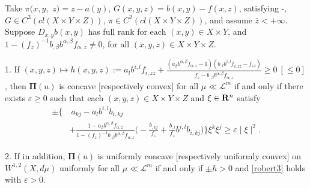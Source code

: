 \begin{example}\label{general example3}
	Take $\pi(x, y,$ $ z) =z-a(y)$,  $G(x,y,z)= b(x,y)-f(x,z)$,  satisfying \Gzero-\Gsix,  $G \in C^3(cl(X\times Y \times Z)
	)$, $\pi \in C^2(cl(X\times Y \times Z)
	)$, and assume $\bar{z}<+\infty$. Suppose $D_{x,y}b(x,y)$ has full rank for each $(x,y) \in X\times Y$, and $1- (f_{z})^{-1}b_{,\beta}b^{\alpha,\beta}f_{\alpha,z} \ne 0$, for all $(x, y,z) \in X\times Y\times Z$.
	
	1. If $(x,y,z)\longmapsto h(x,y,z):=a_{l}b^{i,l}f_{i,zz}+\frac{(a_{\beta}b^{\alpha,\beta}f_{\alpha,z}-1)(b_{,l}b^{i,l}f_{i,zz}-f_{zz})}{f_{z} -b_{,\beta}b^{\alpha,\beta}f_{\alpha,z}} \ge 0 ~[\le 0]$ , then $\pmb \Pi(u)$ is concave  [respectively convex] for all $\mu\ll \mathcal{L}^m$ if and only if there exists $\varepsilon \ge 0$ such that each $(x,y,z) \in X \times Y\times Z$ and $\xi \in {\mathbf R}^{n}$ satisfy 
	\begin{equation}\label{robert3}
	\begin{split}
	\pm \Bigg\{&~a_{kj} -a_{l}b^{i,l}b_{i,kj}\\
	&+\frac{1-a_{\beta}b^{\alpha,\beta}f_{\alpha,z}}
	{1- (f_{z})^{-1}b_{,\beta}b^{\alpha,\beta}f_{\alpha,z}}
	\Big(-\frac{b_{,kj}}{f_z}+\frac{b_{,l}}{f_z}b^{i,l} b_{i,kj}\Big) \Bigg\}\xi^{k}\xi^{j} 
	\ge  \varepsilon \mid \xi\mid ^2.
	\end{split}
	\end{equation}
	
	2. If in addition, $\pmb \Pi(u)$ is uniformly concave [respectively uniformly convex] on $W^{1,2}(X,d\mu)$ uniformly for all $\mu\ll \mathcal{L}^m$ if and only if $\pm h>0$ and  \eqref{robert3} holds with $\varepsilon>0$.
\end{example}

